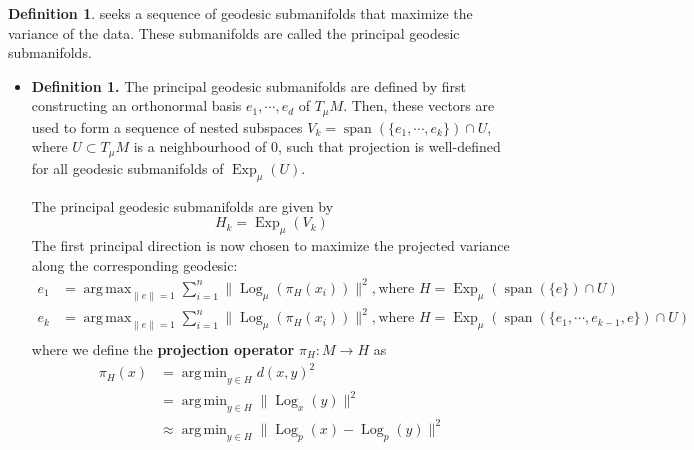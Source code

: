 \documentclass[a4paper]{article}
\theoremstyle{definition}
\newtheorem{definition}{Definition}
\theoremstyle{plain}
\DeclareMathOperator*{\argmin}{arg\,min}
\DeclareMathOperator*{\argmax}{arg\,max}
\begin{document}
\begin{definition}
 seeks a sequence of geodesic submanifolds that maximize the variance of the data. These submanifolds are called the principal geodesic submanifolds.
\begin{itemize}
    \item \textbf{Definition 1.} The principal geodesic submanifolds are defined by first constructing an orthonormal basis $e_1,\cdots,e_d$ of $T_\mu M$. Then, these vectors are used to form a sequence of nested subspaces $V_k=\operatorname{span}(\{e_1,\cdots,e_k\})\cap U$, where $U\subset T_\mu M$ is a neighbourhood of 0, such that projection is well-defined for all geodesic submanifolds of $\operatorname{Exp}_\mu(U)$. 
    
    The principal geodesic submanifolds are given by 
    \begin{equation*}
        H_k=\operatorname{Exp}_\mu(V_k)
    \end{equation*}
    The first principal direction is now chosen to maximize the projected variance along the corresponding geodesic:
    \begin{align*}
        e_1&=\argmax_{\|e\|=1}\sum^n_{i=1}\|\operatorname{Log}_\mu(\pi_H(x_i))\|^2, &&\text{where } H=\operatorname{Exp}_\mu(\operatorname{span}(\{e\})\cap U)\\
        e_k&=\argmax_{\|e\|=1}\sum^n_{i=1}\|\operatorname{Log}_\mu(\pi_H(x_i))\|^2, &&\text{where } H=\operatorname{Exp}_\mu(\operatorname{span}(\{e_1,\cdots,e_{k-1},e\})\cap U)\\
    \end{align*}
    where we define the \textbf{projection operator} $\pi_H:M\rightarrow H$ as
    \begin{align*}
        \pi_H(x)&=\argmin_{y\in H}d(x,y)^2\\ 
        &=\argmin_{y\in H}\|\operatorname{Log}_x(y)\|^2\\
        &\approx\argmin_{y\in H}\|\operatorname{Log}_p(x)-\operatorname{Log}_p(y)\|^2
    \end{align*}
    

\end{itemize}
\end{definition}
\end{document}

